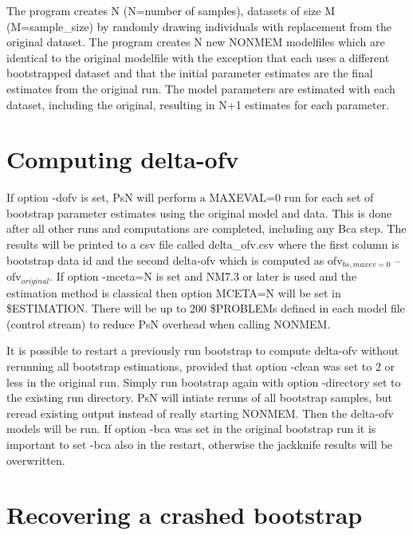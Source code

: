 The program creates N (N=number of samples), datasets of size M (M=sample\_size) by randomly drawing individuals with replacement from the original dataset. The program creates N new NONMEM modelfiles which are identical to the original modelfile with the exception that each uses a different  bootstrapped dataset and that the initial parameter estimates are the final estimates from the original run. The model parameters are estimated with each dataset, including the original, resulting in N+1 estimates for each parameter.

\section{Computing delta-ofv}

If option -dofv is set, PsN will perform a MAXEVAL=0 run for each set of bootstrap parameter estimates using the original model and data. This is done after all other runs and computations are completed, including any Bca step. The results will be printed to a csv file called delta\_ofv.csv where the first column is bootstrap data id and the second delta-ofv which is computed as 
$\mathrm{ofv}_{bs,maxev=0}$ – $\mathrm{ofv}_{original}$. If option -mceta=N is set and NM7.3 or later is used and the estimation method is classical then option MCETA=N will be set in \$ESTIMATION. There will be up to 200 \$PROBLEMs defined in each model file (control stream) to reduce PsN overhead when calling NONMEM.

It is possible to restart a previously run bootstrap to compute delta-ofv without rerunning all bootstrap estimations, provided that option -clean was set to 2 or less in the original run. Simply run bootstrap again with option -directory set to the existing run directory. PsN will intiate reruns of all bootstrap samples, but reread existing output instead of really starting NONMEM. Then the delta-ofv models will be run. If option -bca was set in the original bootstrap run it is important to set -bca also in the restart, otherwise the jackknife results will be overwritten. 

\section{Recovering a crashed bootstrap}


